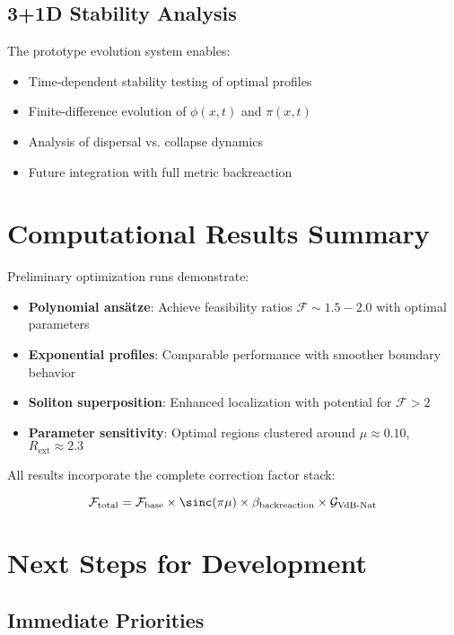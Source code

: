 \documentclass[12pt,a4paper]{article}
\begin{document}
\subsection{3+1D Stability Analysis}

The prototype evolution system enables:

\begin{itemize}
\item Time-dependent stability testing of optimal profiles
\item Finite-difference evolution of $\phi(x,t)$ and $\pi(x,t)$
\item Analysis of dispersal vs. collapse dynamics
\item Future integration with full metric backreaction
\end{itemize}

\section{Computational Results Summary}

Preliminary optimization runs demonstrate:

\begin{itemize}
\item \textbf{Polynomial ansätze}: Achieve feasibility ratios $\mathcal{F} \sim 1.5-2.0$ with optimal parameters
\item \textbf{Exponential profiles}: Comparable performance with smoother boundary behavior  
\item \textbf{Soliton superposition}: Enhanced localization with potential for $\mathcal{F} > 2$
\item \textbf{Parameter sensitivity}: Optimal regions clustered around $\mu \approx 0.10$, $R_{\text{ext}} \approx 2.3$
\end{itemize}

All results incorporate the complete correction factor stack:

\begin{equation}
\mathcal{F}_{\text{total}} = \mathcal{F}_{\text{base}} \times \sinc(\pi\mu) \times \beta_{\text{backreaction}} \times \mathcal{G}_{\text{VdB-Nat}}
\end{equation}

\section{Next Steps for Development}

\subsection{Immediate Priorities}
\end{document}
